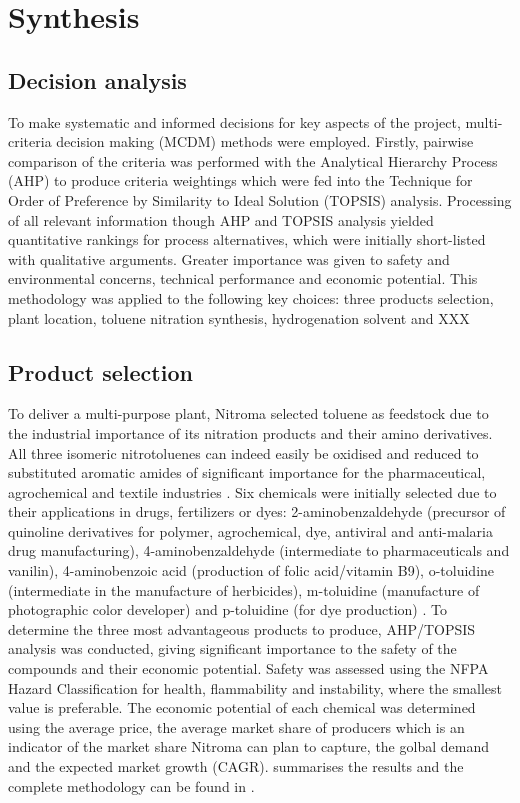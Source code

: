 \section{Synthesis}
\label{sec:synthesis}
\subsection{Decision analysis}
\noindent To make systematic and informed decisions for key aspects of the project, multi-criteria decision making (MCDM) methods were employed. Firstly, pairwise comparison of the criteria was performed with the Analytical Hierarchy Process (AHP) to produce criteria weightings which were fed into the Technique for Order of Preference by Similarity to Ideal Solution (TOPSIS) analysis. Processing of all relevant information though AHP and TOPSIS analysis yielded quantitative rankings for process alternatives, which were initially short-listed with qualitative arguments. Greater importance was given to safety and environmental concerns, technical performance and economic potential.
This methodology was applied to the following key choices: three products selection, plant location, toluene nitration synthesis, hydrogenation solvent and XXX 

\subsection{Product selection}
\noindent To deliver a multi-purpose plant, Nitroma selected toluene as feedstock due to the industrial importance of its nitration products and their amino derivatives. All three isomeric nitrotoluenes can indeed easily be oxidised and reduced to substituted aromatic amides of significant importance for the pharmaceutical, agrochemical and textile industries \cite{dugal_nitrobenzene_2005}. Six chemicals were initially selected due to their applications in drugs, fertilizers or dyes: 2-aminobenzaldehyde (precursor of quinoline derivatives for polymer, agrochemical, dye, antiviral and anti-malaria drug manufacturing), 4-aminobenzaldehyde (intermediate to pharmaceuticals and vanilin), 4-aminobenzoic acid (production of folic acid/vitamin B9), o-toluidine (intermediate in the manufacture of herbicides), m-toluidine (manufacture of  photographic color developer) and p-toluidine (for dye production) \cite{bowers_toluidines_2000,bruhne_benzaldehyde_2011,maki_benzoic_2000}. To determine the three most advantageous products to produce, AHP/TOPSIS analysis was conducted, giving significant importance to the safety of the compounds and their economic potential. Safety was assessed using the NFPA Hazard Classification for health, flammability and instability, where the smallest value is preferable. The economic potential of each chemical was determined using the average price, the average market share of producers which is an indicator of the market share Nitroma can plan to capture, the golbal demand and the expected market growth (CAGR).  summarises the results and the complete methodology can be found in .   



